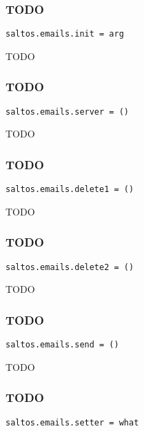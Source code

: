 \documentclass[a4paper]{article}
\begin{document}
\subsubsection{TODO}

\begin{lstlisting}
saltos.emails.init = arg
\end{lstlisting}

TODO

\hypertarget{toc52}{}
\subsubsection{TODO}

\begin{lstlisting}
saltos.emails.server = ()
\end{lstlisting}

TODO

\hypertarget{toc53}{}
\subsubsection{TODO}

\begin{lstlisting}
saltos.emails.delete1 = ()
\end{lstlisting}

TODO

\hypertarget{toc54}{}
\subsubsection{TODO}

\begin{lstlisting}
saltos.emails.delete2 = ()
\end{lstlisting}

TODO

\hypertarget{toc55}{}
\subsubsection{TODO}

\begin{lstlisting}
saltos.emails.send = ()
\end{lstlisting}

TODO

\hypertarget{toc56}{}
\subsubsection{TODO}

\begin{lstlisting}
saltos.emails.setter = what
\end{lstlisting}
\end{document}
